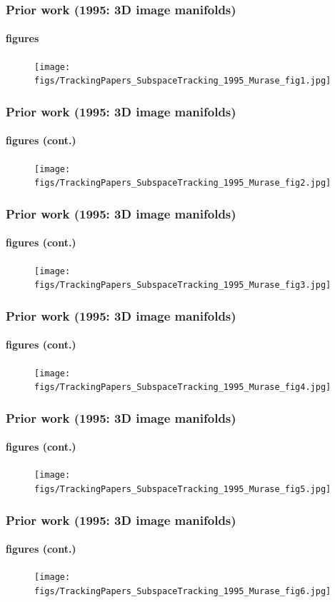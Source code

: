 \begin{frame}
\frametitle{Prior work (1995: 3D image manifolds)}
\framesubtitle{figures}
\mypagenum
	\begin{figure}
		\texttt{[image: figs/TrackingPapers\_SubspaceTracking\_1995\_Murase\_fig1.jpg]}
	\end{figure}
\end{frame}


\begin{frame}
\frametitle{Prior work (1995: 3D image manifolds)}
\framesubtitle{figures (cont.)}
\mypagenum
	\begin{figure}
		\texttt{[image: figs/TrackingPapers\_SubspaceTracking\_1995\_Murase\_fig2.jpg]}
	\end{figure}
\end{frame}



\begin{frame}
\frametitle{Prior work (1995: 3D image manifolds)}
\framesubtitle{figures (cont.)}
\mypagenum
	\begin{figure}
		\texttt{[image: figs/TrackingPapers\_SubspaceTracking\_1995\_Murase\_fig3.jpg]}
	\end{figure}
\end{frame}



\begin{frame}
\frametitle{Prior work (1995: 3D image manifolds)}
\framesubtitle{figures (cont.)}
\mypagenum
	\begin{figure}
		\texttt{[image: figs/TrackingPapers\_SubspaceTracking\_1995\_Murase\_fig4.jpg]}
	\end{figure}
\end{frame}



\begin{frame}
\frametitle{Prior work (1995: 3D image manifolds)}
\framesubtitle{figures (cont.)}
\mypagenum
	\begin{figure}
		\texttt{[image: figs/TrackingPapers\_SubspaceTracking\_1995\_Murase\_fig5.jpg]}
	\end{figure}
\end{frame}


\begin{frame}
\frametitle{Prior work (1995: 3D image manifolds)}
\framesubtitle{figures (cont.)}
\mypagenum
	\begin{figure}
		\texttt{[image: figs/TrackingPapers\_SubspaceTracking\_1995\_Murase\_fig6.jpg]}
	\end{figure}
\end{frame}



